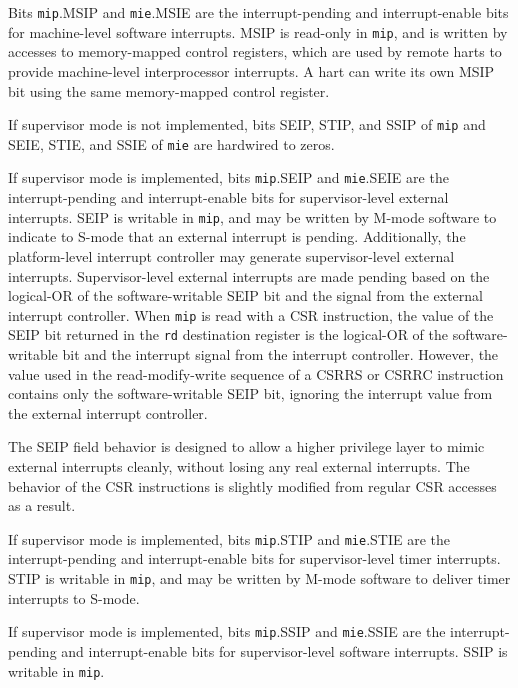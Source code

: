 Bits {\tt mip}.MSIP and {\tt mie}.MSIE are the interrupt-pending and
interrupt-enable bits for machine-level software interrupts.
MSIP is read-only in {\tt mip}, and is written by accesses
to memory-mapped control registers, which are used by remote harts to
provide machine-level interprocessor interrupts.
A hart can write its
own MSIP bit using the same memory-mapped control register.

If supervisor mode is not implemented, bits SEIP, STIP, and SSIP of
{\tt mip} and SEIE, STIE, and SSIE of {\tt mie} are hardwired to zeros.

If supervisor mode is implemented, bits {\tt mip}.SEIP and {\tt mie}.SEIE
are the interrupt-pending and interrupt-enable bits for supervisor-level
external interrupts.
SEIP is writable in {\tt mip}, and
may be written by M-mode software to indicate to S-mode that an
external interrupt is pending.  Additionally, the platform-level
interrupt controller may generate supervisor-level external interrupts.
Supervisor-level external interrupts are made pending based on the
logical-OR of the software-writable SEIP bit and the signal from the
external interrupt controller.
When {\tt mip} is read with a CSR instruction,
the value of the SEIP bit returned in the {\tt rd} destination
register is the logical-OR of the software-writable bit and the
interrupt signal from the interrupt controller.  However, the value
used in the read-modify-write sequence of a CSRRS or CSRRC instruction
contains only the software-writable SEIP bit, ignoring the interrupt value
from the external interrupt controller.

\begin{commentary}
  The SEIP field behavior is designed to allow a higher privilege
  layer to mimic external interrupts cleanly, without losing any real
  external interrupts.  The behavior of the CSR instructions is
  slightly modified from regular CSR accesses as a result.
\end{commentary}

If supervisor mode is implemented, bits {\tt mip}.STIP and {\tt mie}.STIE
are the interrupt-pending and interrupt-enable bits for supervisor-level
timer interrupts.
STIP is writable in {\tt mip}, and may be
written by M-mode software to deliver timer interrupts to S-mode.

If supervisor mode is implemented, bits {\tt mip}.SSIP and {\tt mie}.SSIE
are the interrupt-pending and interrupt-enable bits for supervisor-level
software interrupts.
SSIP is writable in {\tt mip}.

